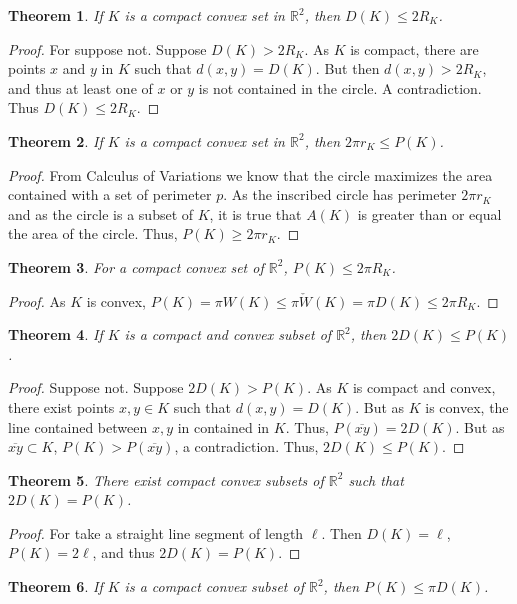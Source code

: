 \documentclass[crop=false,class=book]{standalone}
\theoremstyle{mystyle}
\newtheorem{theorem}{Theorem}[section]
\begin{document}
\begin{theorem}
If $K$ is a compact convex set in $\mathbb{R}^2$, then $D(K) \leq 2R_K$.
\end{theorem}
\begin{proof}
For suppose not. Suppose $D(K) > 2R_K$. As $K$ is compact, there are points $x$ and $y$ in $K$ such that $d(x,y)=D(K)$. But then $d(x,y)>2R_K$, and thus at least one of $x$ or $y$ is not contained in the circle. A contradiction. Thus $D(K)\leq 2R_K$.
\end{proof}
\begin{theorem}
If $K$ is a compact convex set in $\mathbb{R}^2$, then $2\pi r_K \leq P(K)$.
\end{theorem}
\begin{proof}
From Calculus of Variations we know that the circle maximizes the area contained with a set of perimeter $p$. As the inscribed circle has perimeter $2\pi r_K$ and as the circle is a subset of $K$, it is true that $A(K)$ is greater than or equal the area of the circle. Thus, $P(K)\geq 2\pi r_K$.
\end{proof}
\begin{theorem}
For a compact convex set of $\mathbb{R}^2$, $P(K) \leq 2\pi R_K$.
\end{theorem}
\begin{proof}
As $K$ is convex, $P(K) = \pi W(K) \leq \pi \check{W}(K) = \pi D(K) \leq 2\pi R_K$.
\end{proof}
\begin{theorem}
If $K$ is a compact and convex subset of $\mathbb{R}^2$, then $2D(K)\leq P(K)$.
\end{theorem}
\begin{proof}
Suppose not. Suppose $2D(K) >P(K)$. As $K$ is compact and convex, there exist points $x,y\in K$ such that $d(x,y) = D(K)$. But as $K$ is convex, the line contained between $x,y$ in contained in $K$. Thus, $P(\overline{xy}) = 2D(K)$. But as $\overline{xy}\subset K$, $P(K)>P(\overline{xy})$, a contradiction. Thus, $2D(K) \leq P(K)$.
\end{proof}
\begin{theorem}
There exist compact convex subsets of $\mathbb{R}^2$ such that $2D(K) = P(K)$.
\end{theorem}
\begin{proof}
For take a straight line segment of length $\ell$. Then $D(K) = \ell$, $P(K) = 2\ell$, and thus $2D(K) = P(K)$.
\end{proof}
\begin{theorem}
If $K$ is a compact convex subset of $\mathbb{R}^2$, then $P(K) \leq \pi D(K)$.
\end{theorem}
\end{document}
